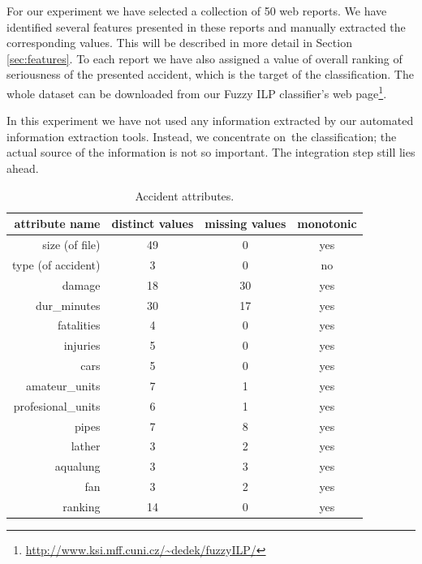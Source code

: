 For our experiment we have selected a collection of 50 web reports. We have identified several features presented in these reports and manually extracted the corresponding values. This will be described in more detail in Section \ref{sec:features}. To each report we have also assigned a value of overall ranking of seriousness of the presented accident, which is the target of the classification. The whole dataset can be downloaded from our Fuzzy ILP classifier's web page\footnote{\url{http://www.ksi.mff.cuni.cz/~dedek/fuzzyILP/}}.

In this experiment we have not used any information extracted by our automated information extraction tools. Instead, we concentrate on~the classification; the actual source of the information is not so important. The integration step still lies ahead.





\begin{table}
\centering
\begin{tabular}{|r||c|c|c|}
\hline
attribute name & distinct values & missing values & monotonic\\
\hline
\hline
size (of file) & 49 & 0 & yes\\
\hline
type (of accident) & 3 & 0 & no\\
\hline
damage & 18 & 30 & yes\\
\hline
dur\_minutes & 30 & 17 & yes\\
\hline
fatalities & 4 & 0 & yes\\
\hline
injuries & 5 & 0 & yes\\
\hline
cars & 5 & 0 & yes\\
\hline
amateur\_units & 7 & 1 & yes\\
\hline
profesional\_units & 6 & 1 & yes\\
\hline
pipes & 7 & 8 & yes\\
\hline
lather & 3 & 2 & yes\\
\hline
aqualung & 3 & 3 & yes\\
\hline
fan & 3 & 2 & yes\\
\hline
ranking & 14 & 0 & yes\\
\hline
\end{tabular}

\caption{Accident attributes.}
\label{img:attributes_description}
\end{table}


